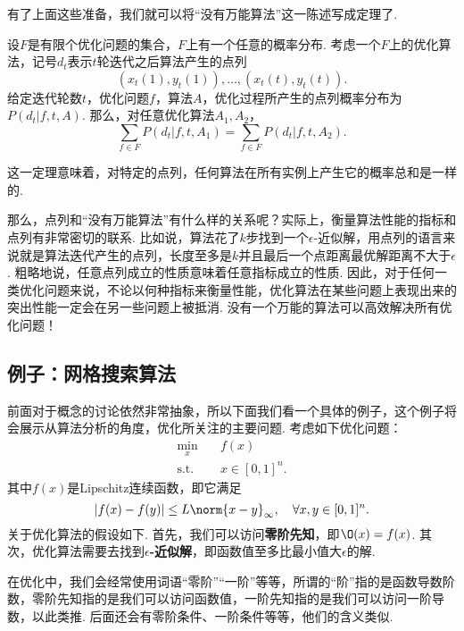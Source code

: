 有了上面这些准备，我们就可以将“没有万能算法”这一陈述写成定理了. 

\begin{theorem}[没有免费午餐定理]\label{thm:no-free-lunch}
    设$F$是有限个优化问题的集合，$F$上有一个任意的概率分布. 考虑一个$F$上的优化算法，记号$d_t$表示$t$轮迭代之后算法产生的点列
    \[(x_t(1),y_t(1)),\dots,(x_t(t),y_t(t)).\]
    给定迭代轮数$t$，优化问题$f$，算法$A$，优化过程所产生的点列概率分布为$P(d_t|f,t,A)$. 那么，对任意优化算法$A_1,A_2$，
    \[\sum_{f\in F} P(d_t|f,t,A_1)=\sum_{f\in F} P(d_t|f,t,A_2).\]
\end{theorem}
这一定理意味着，对特定的点列，任何算法在所有实例上产生它的概率总和是一样的. 

那么，点列和“没有万能算法”有什么样的关系呢？实际上，衡量算法性能的指标和点列有非常密切的联系. 比如说，算法花了$k$步找到一个$\epsilon$-近似解，用点列的语言来说就是算法迭代产生的点列，长度至多是$k$并且最后一个点距离最优解距离不大于$\epsilon$. 粗略地说，任意点列成立的性质意味着任意指标成立的性质. 因此，对于任何一类优化问题来说，不论以何种指标来衡量性能，优化算法在某些问题上表现出来的突出性能一定会在另一些问题上被抵消. 没有一个万能的算法可以高效解决所有优化问题！


\subsection{例子：网格搜索算法}

前面对于概念的讨论依然非常抽象，所以下面我们看一个具体的例子，这个例子将会展示从算法分析的角度，优化所关注的主要问题. 考虑如下优化问题：
\begin{equation}
    \begin{aligned}
    \min_{x}&\quad f(x)\\
    \text{s.t.}&\quad x\in[0,1]^n.
\end{aligned}\label{opt:gird-search}
\end{equation}
其中$f(x)$是Lipschitz连续函数，即它满足
    \[|f(x)-f(y)|\leq L\norm{x-y}_\infty,\quad\forall x,y\in[0,1]^n.\]
关于优化算法的假设如下. 首先，我们可以访问\textbf{零阶先知}，即$\O(x)=f(x)$. 其次，优化算法需要去找到\textbf{$\epsilon$-近似解}，即函数值至多比最小值大$\epsilon$的解.

\begin{remark}
        在优化中，我们会经常使用词语“零阶”“一阶”等等，所谓的“阶”指的是函数导数阶数，零阶先知指的是我们可以访问函数值，一阶先知指的是我们可以访问一阶导数，以此类推. 后面还会有零阶条件、一阶条件等等，他们的含义类似. 
\end{remark}

